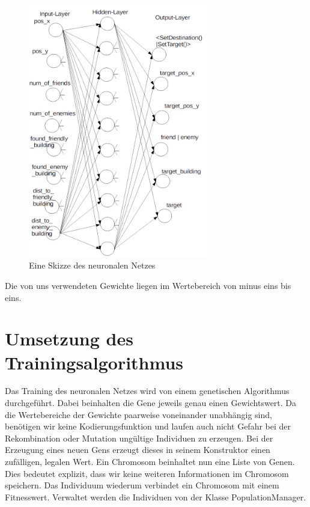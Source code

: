 \documentclass[
	12pt,
	a4paper,
	BCOR10mm,
	DIV14,
	headsepline,
	usegeometry,
]{scrreprt}
\begin{document}
\begin{figure}[h!]
	\centering
	\includegraphics[width = 0.7\textwidth]{VisualisierungNN.png}
	\caption{Eine Skizze des neuronalen Netzes}
	\label{NN}
\end{figure}

Die von uns verwendeten Gewichte liegen im Wertebereich von minus eins bis eins.

\section{Umsetzung des Trainingsalgorithmus}
Das Training des neuronalen Netzes wird von einem genetischen Algorithmus durchgeführt.
Dabei beinhalten die Gene jeweils genau einen Gewichtswert.
Da die Wertebereiche der Gewichte paarweise voneinander unabhängig sind, benötigen wir keine Kodierungsfunktion und laufen auch nicht Gefahr bei der Rekombination oder Mutation ungültige Individuen zu erzeugen.
Bei der Erzeugung eines neuen Gens erzeugt dieses in seinem Konstruktor einen zufälligen, legalen Wert.
Ein Chromosom beinhaltet nun eine Liste von Genen.
Dies bedeutet explizit, dass wir keine weiteren Informationen im Chromosom speichern.
Das Individuum wiederum verbindet ein Chromosom mit einem Fitnesswert.
Verwaltet werden die Individuen von der Klasse PopulationManager.
\end{document}
